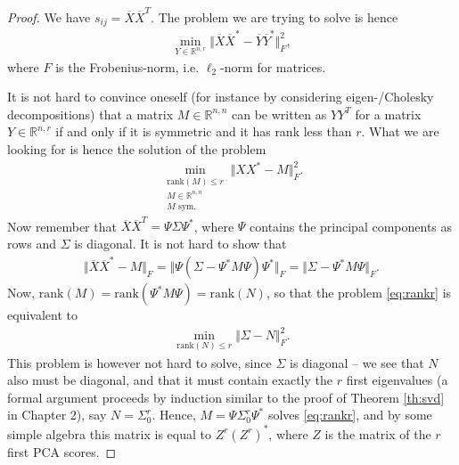 \documentclass{article}
\newcommand{\R}{\mathbb{R}}
\newcommand{\norm}[1]{\Vert #1 \Vert}
\begin{document}
\begin{proof}
    We have $s_{ij}= \overline{X}\overline{X}^T$. The problem we are trying to solve is hence
    \begin{align}
        \min_{Y\in \R^{n,r}} \norm{\overline{X}\overline{X}^*-\overline{Y}\overline{Y}^*}_F^2, \label{eq:rankr}
    \end{align}
    where $F$ is the Frobenius-norm, i.e. $\ell_2$-norm for matrices.

    It is not hard to convince oneself (for instance by considering eigen-/Cholesky decompositions) that a matrix $M\in \R^{n,n}$ can be written as $YY^T$ for a matrix $Y\in \R^{n,r}$ if and only if it is symmetric and it has rank less than $r$. What we are looking for is hence the solution of the problem
    \begin{align*}
        \min_{\substack{\mathrm{rank}(M)\leq r  \\M\in \R^{n,n} \\ M \text{ sym.}}} \norm{XX^*-M}_F^2.
    \end{align*}
    Now remember that $\overline{X}\overline{X}^T = \Psi\Sigma \Psi^*$, where $\Psi$ contains the principal components as rows and $\Sigma$ is diagonal. It is not hard to show that
    \begin{align*}
       \norm{\overline{X}\overline{X}^*-M}_F = \norm{\Psi(\Sigma-\Psi^*M\Psi)\Psi^*}_F = \norm{
       \Sigma-\Psi^*M\Psi}_F.
    \end{align*}
    Now, $\mathrm{rank}(M)= \mathrm{rank}(\Psi^*M\Psi)=\mathrm{rank}(N)$, so that the problem \eqref{eq:rankr} is equivalent to 
    \begin{align*}
        \min_{\mathrm{rank}(N)\leq r} \norm{\Sigma-N}_F^2.
    \end{align*}
    This problem is however not hard to solve, since $\Sigma$ is diagonal -- we see that $N$ also must be diagonal, and that it must contain exactly the $r$ first eigenvalues (a formal argument proceeds by induction similar to the proof of Theorem \ref{th:svd} in Chapter 2), say $N=\Sigma_0^r$. Hence,  $M=\Psi\Sigma_0^r\Psi^*$ solves \eqref{eq:rankr}, and by some simple algebra this matrix is equal to $Z^r(Z^r)^*$, where $Z$ is the matrix of the $r$ first PCA scores.
\end{proof}
\end{document}
